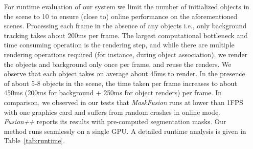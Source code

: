 For runtime evaluation of our system we limit the number of initialized objects in the scene to 10 to ensure (close to) online performance on the aforementioned scenes. Processing each frame in the absence of any objects i.e., only background tracking takes about 200ms per frame. The largest computational bottleneck and time consuming operation is the rendering step, and while there are multiple rendering operations required (for instance, during object association), we render the objects and background only once per frame, and reuse the renders. We observe that each object takes on average about 45ms to render. In the presence of about 5-8 objects in the scene, the time taken per frame increases to about 450ms (200ms for background + 250ms for object renders) per frame. In comparison, we observed in our tests that \textit{MaskFusion} runs at lower than 1FPS with one graphics card and suffers from random crashes in online mode. \textit{Fusion++} reports its results with pre-computed segmentation masks. Our method runs seamlessly on a single GPU. A detailed runtime analysis is given in Table~\ref{tab:runtime}.

\begin{table}[ht]
    \centering
    \caption{Runtime breakdown component-wise for our pipeline}
    \label{tab:runtime}
\end{table}
